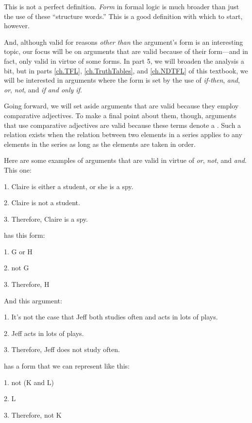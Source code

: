 \noindent This is not a perfect definition. \textit{Form} in formal logic is much broader than just the use of these ``structure words.'' This is a good definition with which to start, however.

And, although valid for reasons \textit{other than} the argument's form is an interesting topic, our focus will be on arguments that are valid because of their form---and in fact, only valid in virtue of some forms. In part 5, we will broaden the analysis a bit, but in parts  \ref{ch.TFL}, \ref{ch.TruthTables}, and \ref{ch.NDTFL} of this textbook, we will be interested in arguments where the form is set by the use of  \textit{if-then}, \textit{and}, \textit{or}, \textit{not}, and \textit{if and only if}. 

\begin{notebox}
Going forward, we will set aside arguments that are valid because they employ comparative adjectives. To make a final point about them, though, arguments that use comparative adjectives are valid because these terms denote a . Such a relation exists when the relation between two elements in a series applies to any elements in the series as long as the elements are taken in order. 
\end{notebox}

Here are some examples of arguments that are valid in virtue of \textit{or}, \textit{not}, and \textit{and}.
This one:
	\begin{earg}
		\item[1.] Claire is either a student, or she is a spy.
		\item[2.] Claire is not a student.
		\item[3.] Therefore, Claire is a spy.
	\end{earg}
has this form:
	\begin{earg}
		\item[1.] G or H
		\item[2.] not G
		\item[3.] Therefore, H
	\end{earg}
And this argument:
	\begin{earg}
		\item[1.] It's not the case that Jeff both studies often and acts in lots of plays.
		\item[2.] Jeff acts in lots of plays.
		\item[3.] Therefore, Jeff does not study often.
	\end{earg}
has a form that we can represent like this:
	\begin{earg}
		\item[1.] not (K and L)
		\item[2.] L
		\item[3.] Therefore, not K
	\end{earg}

